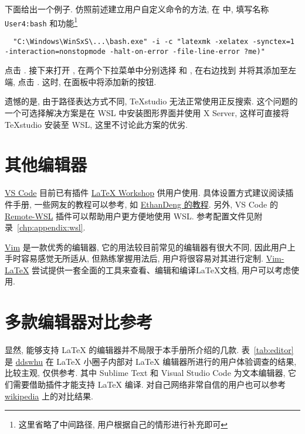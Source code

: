 下面给出一个例子.
仿照前述建立用户自定义命令的方法,
在
中,
填写名称
\texttt{User4:bash}
和功能\footnote{这里省略了中间路径, 用户根据自己的情形进行补充即可}
\begin{lstlisting}
  "C:\Windows\WinSxS\...\bash.exe" -i -c "latexmk -xelatex -synctex=1 -interaction=nonstopmode -halt-on-error -file-line-error ?me)"
\end{lstlisting}
点击 . 
接下来打开 ,
在两个下拉菜单中分别选择  和 ,
在右边找到  并将其添加至左端, 点击 . 
这时, 在面板中将添加新的按钮. 

遗憾的是, 由于路径表达方式不同, \TeX studio 无法正常使用正反搜索.
这个问题的一个可选择解决方案是在 WSL 中安装图形界面并使用 X Server,
这样可直接将 \TeX studio 安装至 WSL,
这里不讨论此方案的优劣.

\section{其他编辑器}

\href{https://code.visualstudio.com/}{VS Code} 目前已有插件
\href{https://marketplace.visualstudio.com/items?itemName=James-Yu.latex-workshop}{LaTeX Workshop}
供用户使用.
具体设置方式建议阅读插件手册,
一些网友的教程可以参考,
如
\href{https://github.com/EthanDeng/vscode-latex}{EthanDeng 的教程}.
另外,
VS Code 的
\href{https://marketplace.visualstudio.com/items?itemName=ms-vscode-remote.remote-wsl}{Remote-WSL}
插件可以帮助用户更方便地使用 WSL.
参考配置文件见附录~\ref{chp:appendix:wsl}.

\href{https://www.vim.org/}{Vim} 是一款优秀的编辑器,
它的用法较目前常见的编辑器有很大不同,
因此用户上手时容易感觉无所适从,
但熟练掌握用法后,
用户将很容易对其进行定制.
\href{http://vim-latex.sourceforge.net/}{Vim-LaTeX}
尝试提供一套全面的工具来查看、编辑和编译LaTeX文档,
用户可以考虑使用.

\section{多款编辑器对比参考}

显然, 能够支持 \LaTeX{} 的编辑器并不局限于本手册所介绍的几款.
表~\ref{tab:editor} 是 \href{https://ddswhu.me/}{ddswhu} 在 \LaTeX{}
小圈子内部对 \LaTeX{} 编辑器所进行的用户体验调查的结果, 比较主观, 仅供参考.
其中 Sublime Text 和 Visual Studio Code 为文本编辑器,
它们需要借助插件才能支持 \LaTeX{} 编译.
对自己网络非常自信的用户也可以参考
\href{https://en.wikipedia.org/wiki/Comparison_of_TeX_editors}{wikipedia}
上的对比结果.

